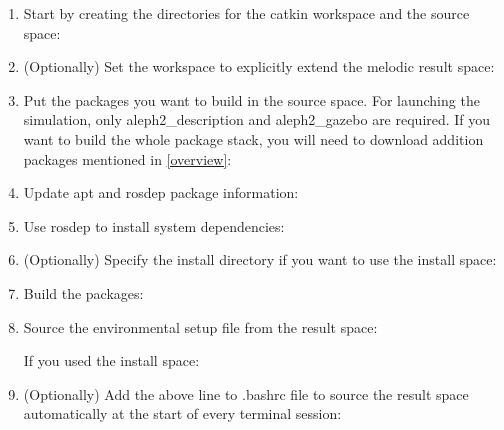 \documentclass[english,inz,shortabstract]{iithesis}
\begin{document}
\begin{enumerate}

\item Start by creating the directories for the catkin workspace and the source space:


\item (Optionally) Set the workspace to explicitly extend the \textsf{melodic} result space:


\item Put the packages you want to build in the source space. For launching the simulation, only \textsf{aleph2\_description} and \textsf{aleph2\_gazebo} are required. If you want to build the whole package stack, you will need to download addition packages mentioned in \ref{overview}:


\item Update \textsf{apt} and \textsf{rosdep} package information:


\item Use \textsf{rosdep} to install system dependencies:


\item (Optionally) Specify the install directory if you want to use the install space:


\item Build the packages:


\item Source the environmental setup file from the result space:

If you used the install space:


\item (Optionally) Add the above line to \textsf{.bashrc} file to source the result space automatically at the start of every terminal session:


\end{enumerate}
\end{document}
